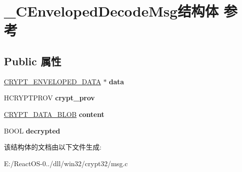 \hypertarget{struct___c_enveloped_decode_msg}{}\section{\+\_\+\+C\+Enveloped\+Decode\+Msg结构体 参考}
\label{struct___c_enveloped_decode_msg}
\subsection*{Public 属性}
\begin{DoxyCompactItemize}
\item 
\mbox{\label{struct___c_enveloped_decode_msg_a77abcd4219c6b74b9ab4762eb63f9f5d}} 
\hyperlink{struct___c_r_y_p_t___e_n_v_e_l_o_p_e_d___d_a_t_a}{C\+R\+Y\+P\+T\+\_\+\+E\+N\+V\+E\+L\+O\+P\+E\+D\+\_\+\+D\+A\+TA} $\ast$ {\bfseries data}
\item 
\mbox{\label{struct___c_enveloped_decode_msg_ac5e0dc90b76e3554fa1ef2ef1b9d06f3}} 
H\+C\+R\+Y\+P\+T\+P\+R\+OV {\bfseries crypt\+\_\+prov}
\item 
\mbox{\label{struct___c_enveloped_decode_msg_ae522d64552d837b2c268393ec8028f5b}} 
\hyperlink{struct___c_r_y_p_t_o_a_p_i___b_l_o_b}{C\+R\+Y\+P\+T\+\_\+\+D\+A\+T\+A\+\_\+\+B\+L\+OB} {\bfseries content}
\item 
\mbox{\label{struct___c_enveloped_decode_msg_a8f1135b43af3702803286f5dcf22b51c}} 
B\+O\+OL {\bfseries decrypted}
\end{DoxyCompactItemize}


该结构体的文档由以下文件生成\+:\begin{DoxyCompactItemize}
\item 
E\+:/\+React\+O\+S-\/0../dll/win32/crypt32/msg.\+c\end{DoxyCompactItemize}
